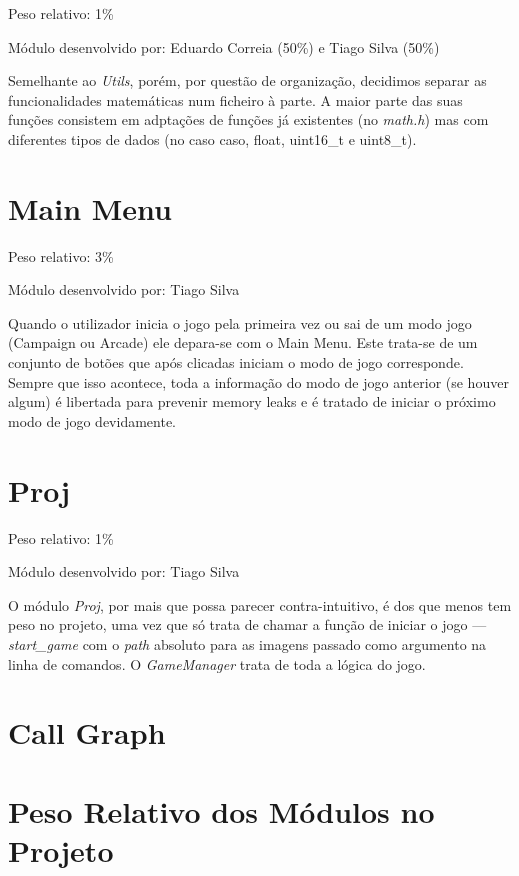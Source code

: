 \documentclass{report}
\begin{document}
Peso relativo: 1\%

Módulo desenvolvido por: Eduardo Correia (50\%) e Tiago Silva (50\%)
\newline

Semelhante ao \textit{Utils}, porém, por questão de organização, decidimos separar as funcionalidades matemáticas num ficheiro à parte. A maior parte das suas funções consistem em adptações de funções já existentes (no \textit{math.h}) mas com diferentes tipos de dados (no caso caso, float, uint16\_t e uint8\_t).

\section{Main Menu}

Peso relativo: 3\%

Módulo desenvolvido por: Tiago Silva
\newline

Quando o utilizador inicia o jogo pela primeira vez ou sai de um modo jogo (Campaign ou Arcade) ele depara-se com o Main Menu. Este trata-se de um conjunto de botões que após clicadas iniciam o modo de jogo corresponde. Sempre que isso acontece, toda a informação do modo de jogo anterior (se houver algum) é libertada para prevenir memory leaks e é tratado de iniciar o próximo modo de jogo devidamente.

\section{Proj}

Peso relativo: 1\%

Módulo desenvolvido por: Tiago Silva
\newline

O módulo \textit{Proj}, por mais que possa parecer contra-intuitivo, é dos que menos tem peso no projeto, uma vez que só trata de chamar a função de iniciar o jogo --- \textit{start\_game} com o \textit{path} absoluto para as imagens passado como argumento na linha de comandos. O \textit{GameManager} trata de toda a lógica do jogo.

\section{Call Graph}


\section{Peso Relativo dos Módulos no Projeto}
\end{document}
